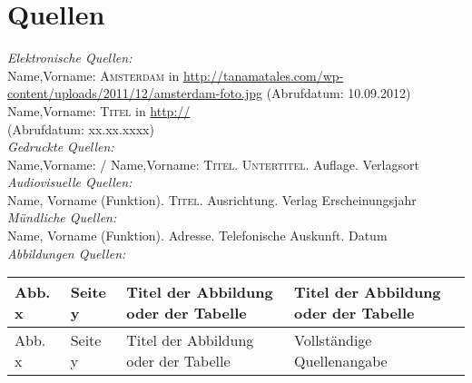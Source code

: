 \part{Quellen}


\emph{Elektronische Quellen:}\\
\textnormal{Name,Vorname:}
\textsc{Amsterdam} in
\url{http://tanamatales.com/wp-content/uploads/2011/12/amsterdam-foto.jpg}
\textnormal{(Abrufdatum: 10.09.2012)}
\\[0.4cm]
\textnormal{Name,Vorname:}
\textsc{Titel} in
\url{http://}
\textnormal{\\(Abrufdatum: xx.xx.xxxx)}
\\[0.4cm]
\emph{Gedruckte Quellen:}\\
\textnormal{Name,Vorname: / Name,Vorname:}
\textsc{Titel}.
\textsc{Untertitel}.
\textnormal{Auflage}.
\textnormal{Verlagsort}
\\[0.4cm]
\emph{Audiovisuelle Quellen:}\\
\textnormal{Name, Vorname}
\textnormal{(Funktion)}. 
\textsc{Titel}. 
\textnormal{Ausrichtung}. 
\textnormal{Verlag} 
\textnormal{Erscheinungsjahr}
\\[0.4cm]
\emph{Mündliche Quellen:}\\
\textnormal{Name, Vorname}
\textnormal{(Funktion)}. 
\textnormal{Adresse}. 
\textnormal{Telefonische Auskunft}. 
\textnormal{Datum} 
\\[0.4cm]
\emph{Abbildungen Quellen:}
\begin{center}
    \begin{tabular}{ | l | l | l | p{5cm} |}
    \hline
    Abb. x & Seite y & Titel der Abbildung oder der Tabelle & Titel der Abbildung oder der Tabelle \\ \hline
    Abb. x & Seite y & Titel der Abbildung oder der Tabelle & Vollständige Quellenangabe \\ \hline
    \end{tabular}
\end{center}

